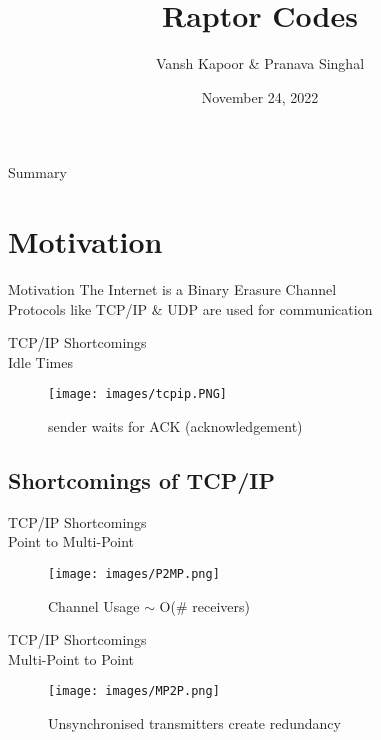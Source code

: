 \documentclass[handout,11pt]{beamer}
\author{Vansh Kapoor \& Pranava Singhal}
\title{Raptor Codes}
\institute[]{EE605 Course Project \\ 
Guide: Prof. Nikhil Karamchandani}
\date{November 24, 2022}
\begin{document}
\begin{frame}
\titlepage
\end{frame}

\begin{frame}{Summary}
\tableofcontents 
\end{frame}

\section{Motivation}
\begin{frame}{Motivation}
The Internet is a Binary Erasure Channel\\

Protocols like TCP/IP \& UDP are used for communication

\end{frame}

\begin{frame}{TCP/IP Shortcomings\\Idle Times}
\begin{figure}
    \centering
    \texttt{[image: images/tcpip.PNG]}
    \caption{sender waits for ACK (acknowledgement)}
    \label{fig:tcpip}
\end{figure}
\end{frame}

\subsection{Shortcomings of TCP/IP}
\begin{frame}{TCP/IP Shortcomings\\Point to Multi-Point}
\begin{figure}
    \centering
    \texttt{[image: images/P2MP.png]}
    \caption{Channel Usage $\mathtt{\sim}$ O(\# receivers)}
    \label{fig:my_label}
\end{figure}
\end{frame}

\begin{frame}{TCP/IP Shortcomings\\Multi-Point to Point}

\begin{figure}
    \centering
    \texttt{[image: images/MP2P.png]}
    \caption{Unsynchronised transmitters create redundancy}
    \label{fig:my_label}
\end{figure}

\end{frame}
\end{document}
